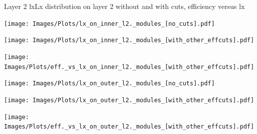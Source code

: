 \documentclass{beamer}
\begin{document}
\begin{frame}{Layer 2 lx}{Lx distribution on layer 2 without and with cuts, efficiency versus lx}
\begin{minipage}{0.32\textwidth}
  \centering
  \texttt{[image: Images/Plots/lx\_on\_inner\_l2.\_modules\_[no\_cuts].pdf]}
\end{minipage}%
\hspace{0.01\textwidth}%
\begin{minipage}{0.32\textwidth}
  \centering
  \texttt{[image: Images/Plots/lx\_on\_inner\_l2.\_modules\_[with\_other\_effcuts].pdf]}
\end{minipage}%
\hspace{0.01\textwidth}%
\begin{minipage}{0.32\textwidth}
  \centering
  \texttt{[image: Images/Plots/eff.\_vs\_lx\_on\_inner\_l2.\_modules\_[with\_other\_effcuts].pdf]}
\end{minipage}
\begin{minipage}{0.32\textwidth}
  \centering
  \texttt{[image: Images/Plots/lx\_on\_outer\_l2.\_modules\_[no\_cuts].pdf]}
\end{minipage}%
\hspace{0.01\textwidth}%
\begin{minipage}{0.32\textwidth}
  \centering
  \texttt{[image: Images/Plots/lx\_on\_outer\_l2.\_modules\_[with\_other\_effcuts].pdf]}
\end{minipage}%
\hspace{0.01\textwidth}%
\begin{minipage}{0.32\textwidth}
  \centering
  \texttt{[image: Images/Plots/eff.\_vs\_lx\_on\_outer\_l2.\_modules\_[with\_other\_effcuts].pdf]}
\end{minipage}
\end{frame}
\end{document}
